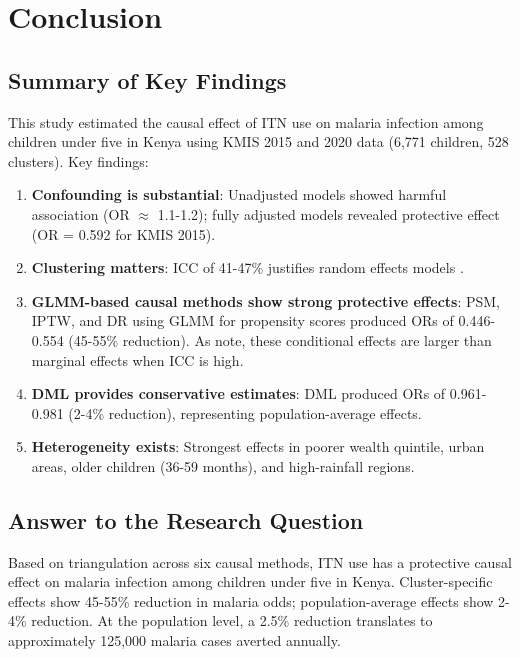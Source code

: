 \chapter{Conclusion}

\section{Summary of Key Findings}

This study estimated the causal effect of ITN use on malaria infection among children under five in Kenya using KMIS 2015 and 2020 data (6,771 children, 528 clusters). Key findings:

\begin{enumerate}
	\item \textbf{Confounding is substantial}: Unadjusted models showed harmful association (OR $\approx$ 1.1-1.2); fully adjusted models revealed protective effect (OR = 0.592 for KMIS 2015).
	
	\item \textbf{Clustering matters}: ICC of 41-47\% justifies random effects models \citep{killip2004intracluster}.
	
	\item \textbf{GLMM-based causal methods show strong protective effects}: PSM, IPTW, and DR using GLMM for propensity scores produced ORs of 0.446-0.554 (45-55\% reduction). As \citet{neuhaus1991comparison} note, these conditional effects are larger than marginal effects when ICC is high.
	
	\item \textbf{DML provides conservative estimates}: DML produced ORs of 0.961-0.981 (2-4\% reduction), representing population-average effects.
	
	\item \textbf{Heterogeneity exists}: Strongest effects in poorer wealth quintile, urban areas, older children (36-59 months), and high-rainfall regions.
\end{enumerate}

\section{Answer to the Research Question}

Based on triangulation across six causal methods, ITN use has a protective causal effect on malaria infection among children under five in Kenya. Cluster-specific effects show 45-55\% reduction in malaria odds; population-average effects show 2-4\% reduction. At the population level, a 2.5\% reduction translates to approximately 125,000 malaria cases averted annually.

